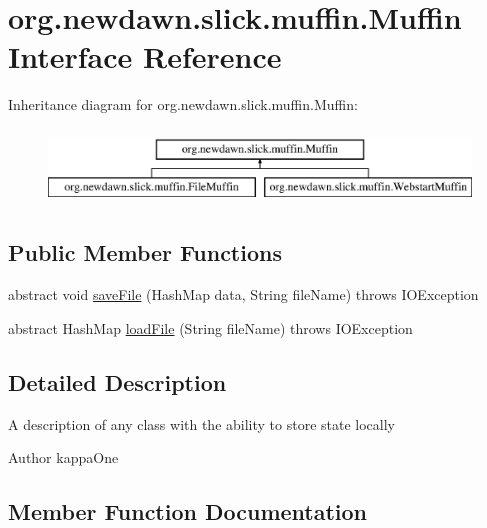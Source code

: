 \hypertarget{interfaceorg_1_1newdawn_1_1slick_1_1muffin_1_1_muffin}{}\section{org.\+newdawn.\+slick.\+muffin.\+Muffin Interface Reference}
\label{interfaceorg_1_1newdawn_1_1slick_1_1muffin_1_1_muffin}
Inheritance diagram for org.\+newdawn.\+slick.\+muffin.\+Muffin\+:\begin{figure}[H]
\begin{center}
\leavevmode
\includegraphics[height=2.000000cm]{interfaceorg_1_1newdawn_1_1slick_1_1muffin_1_1_muffin}
\end{center}
\end{figure}
\subsection*{Public Member Functions}
\begin{DoxyCompactItemize}
\item 
abstract void \mbox{\hyperlink{interfaceorg_1_1newdawn_1_1slick_1_1muffin_1_1_muffin_a025189130fb123bc751e58677435974a}{save\+File}} (Hash\+Map data, String file\+Name)  throws I\+O\+Exception
\item 
abstract Hash\+Map \mbox{\hyperlink{interfaceorg_1_1newdawn_1_1slick_1_1muffin_1_1_muffin_a2d6256b6d8f26b294f06341985047fbe}{load\+File}} (String file\+Name)  throws I\+O\+Exception
\end{DoxyCompactItemize}


\subsection{Detailed Description}
A description of any class with the ability to store state locally

\begin{DoxyAuthor}{Author}
kappa\+One 
\end{DoxyAuthor}


\subsection{Member Function Documentation}
\mbox{\label{interfaceorg_1_1newdawn_1_1slick_1_1muffin_1_1_muffin_a2d6256b6d8f26b294f06341985047fbe}} 
